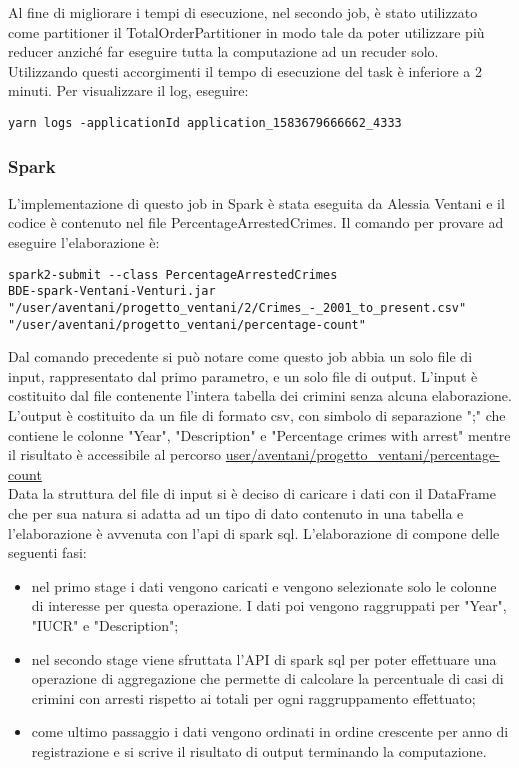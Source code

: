 \documentclass[10pt]{article}
\begin{document}
Al fine di migliorare i tempi di esecuzione, nel secondo job, è stato utilizzato come partitioner il TotalOrderPartitioner in modo tale da poter utilizzare più reducer anziché far eseguire tutta la computazione ad un recuder solo. Utilizzando questi accorgimenti il tempo di esecuzione del task è inferiore a 2 minuti.
Per visualizzare il log, eseguire:
\begin{lstlisting}
yarn logs -applicationId application_1583679666662_4333
\end{lstlisting}

\subsubsection{Spark}
L'implementazione di questo job in Spark è stata eseguita da Alessia Ventani e il codice è contenuto nel file PercentageArrestedCrimes.
Il comando per provare ad eseguire l'elaborazione è:
\begin{lstlisting}
spark2-submit --class PercentageArrestedCrimes 
BDE-spark-Ventani-Venturi.jar 
"/user/aventani/progetto_ventani/2/Crimes_-_2001_to_present.csv" 
"/user/aventani/progetto_ventani/percentage-count"
\end{lstlisting}

Dal comando precedente si può notare come questo job abbia un solo file di input, rappresentato dal primo parametro, e un solo file di output. L'input è costituito dal file contenente l'intera tabella dei crimini senza alcuna elaborazione. L'output è costituito da un file di formato csv, con simbolo di separazione ";" che contiene le colonne "Year", "Description" e "Percentage crimes with arrest" mentre il risultato è accessibile al percorso \url{user/aventani/progetto_ventani/percentage-count}\\

Data la struttura del file di input si è deciso di caricare i dati con il DataFrame che per sua natura si adatta ad un tipo di dato contenuto in una tabella e l'elaborazione è avvenuta con l'api di spark sql.
L'elaborazione di compone delle seguenti fasi:
\begin{itemize}
\item nel primo stage i dati vengono caricati e vengono selezionate solo le colonne di interesse per questa operazione. I dati poi vengono raggruppati per "Year", "IUCR" e "Description";
\item nel secondo stage viene sfruttata l'API di spark sql per poter effettuare una operazione di aggregazione che permette di calcolare la percentuale di casi di crimini con arresti rispetto ai totali per ogni raggruppamento effettuato;
\item come ultimo passaggio i dati vengono ordinati in ordine crescente per anno di registrazione e si scrive il risultato di output terminando la computazione.
\end{itemize}
\end{document}
